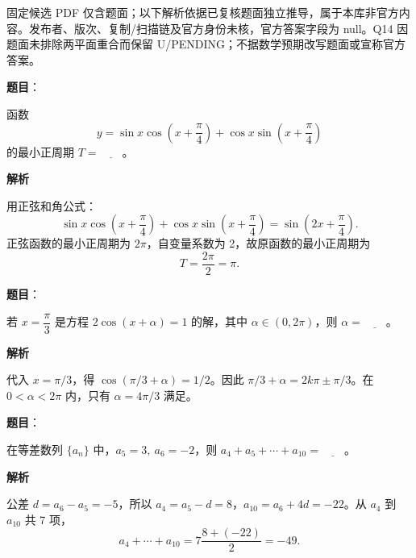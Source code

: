 

\begin{gktip}
固定候选 PDF 仅含题面；以下解析依据已复核题面独立推导，属于本库非官方内容。发布者、版次、复制/扫描链及官方身份未核，官方答案字段为 null。Q14 因题面未排除两平面重合而保留 U/PENDING；不据数学预期改写题面或宣称官方答案。
\end{gktip}


\begin{answer}

\textbf{题目}：

函数
\nopagebreak[4]
\[
   y=\sin x\cos\left(x+\frac{\pi}{4}\right)+\cos x\sin\left(x+\frac{\pi}{4}\right)
\]
   的最小正周期 \(T=\underline{\qquad}\)。

\textbf{解析}

用正弦和角公式：
\nopagebreak[4]
\[
\sin x\cos\left(x+\frac\pi4\right)+\cos x\sin\left(x+\frac\pi4\right)
=\sin\left(2x+\frac\pi4\right).
\]
正弦函数的最小正周期为 \(2\pi\)，自变量系数为 2，故原函数的最小正周期为
\nopagebreak[4]
\[
T=\frac{2\pi}{2}=\pi.
\]


\end{answer}
\begin{answer}

\textbf{题目}：

若 \(x=\dfrac{\pi}{3}\) 是方程 \(2\cos(x+\alpha)=1\) 的解，其中 \(\alpha\in(0,2\pi)\)，则 \(\alpha=\underline{\qquad}\)。

\textbf{解析}

代入 \(x=\pi/3\)，得 \(\cos(\pi/3+\alpha)=1/2\)。因此
\(\pi/3+\alpha=2k\pi\pm\pi/3\)。在 \(0<\alpha<2\pi\) 内，只有
\(\alpha=4\pi/3\) 满足。


\end{answer}
\begin{answer}

\textbf{题目}：

在等差数列 \(\{a_n\}\) 中，\(a_5=3,\ a_6=-2\)，则 \(a_4+a_5+\cdots+a_{10}=\underline{\qquad}\)。

\textbf{解析}

公差 \(d=a_6-a_5=-5\)，所以 \(a_4=a_5-d=8\)，\(a_{10}=a_6+4d=-22\)。从 \(a_4\) 到 \(a_{10}\) 共 7 项，
\nopagebreak[4]
\[
a_4+\cdots+a_{10}=7\frac{8+(-22)}2=-49.
\]


\end{answer}
